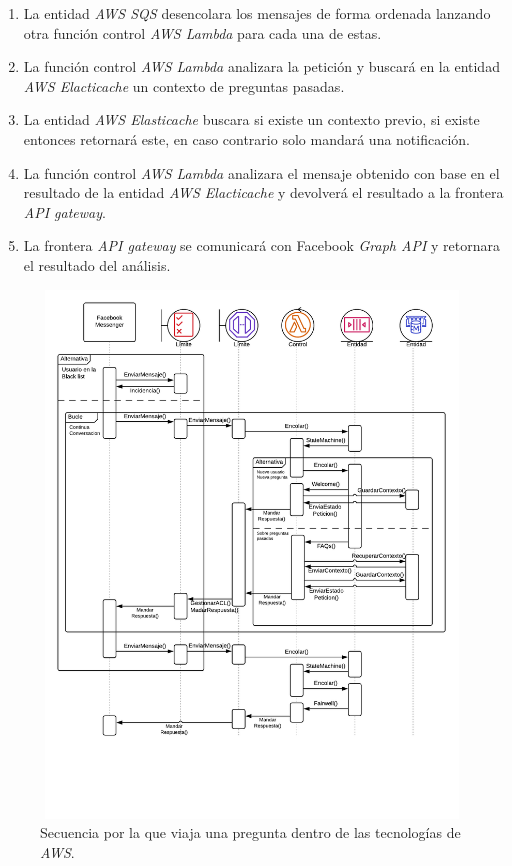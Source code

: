 \begin{enumerate}
            
            \item La entidad \textit{AWS SQS} desencolara los mensajes de forma ordenada lanzando otra función control \textit{AWS Lambda} para cada una de estas.
            \item La función control \textit{AWS Lambda} analizara la petición y buscará en la entidad \textit{AWS Elacticache} un contexto de preguntas pasadas.
            \item La entidad \textit{AWS Elasticache} buscara si existe un contexto previo, si existe entonces retornará este, en caso contrario solo mandará una notificación.
            \item La función control \textit{AWS Lambda} analizara el mensaje obtenido con base en el resultado de la entidad \textit{AWS Elacticache}  y devolverá el resultado a la frontera \textit{API gateway}.
            \item La frontera \textit{API gateway} se comunicará con Facebook \textit{Graph API} y retornara el resultado del análisis.
        \end{enumerate}
        
        \begin{figure}[H]
             \centering
             \includegraphics[height=14cm, width=16.5cm]{Latex/Classes/Imagenes/Diagrama_de_secuencia_del_sistema.png}
             \caption{Secuencia por la que viaja una pregunta dentro de las tecnologías de \textit{AWS}.}
             \label{fig:diagrama_secuencia}

        \end{figure}
    

